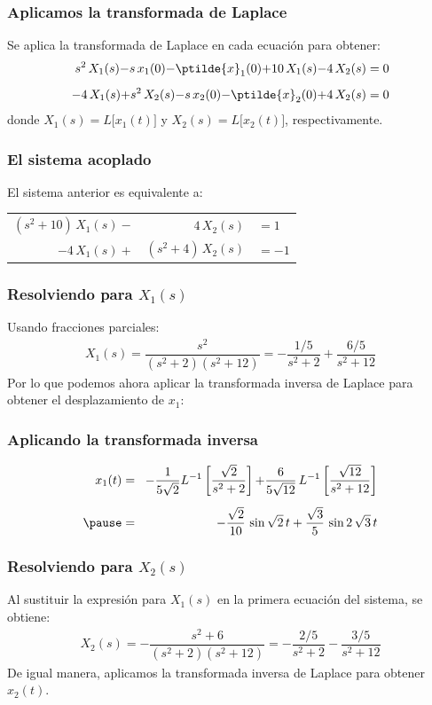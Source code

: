 \begin{frame}
\frametitle{Aplicamos la transformada de Laplace}
Se aplica la transformada de Laplace en cada ecuación para obtener: \pause
\begin{align*}
s^{2} \, X_{1}(s) {-} s \, x_{1}(0) {-} \ptilde{x}_{1}(0) {+} 10 \, X_{1}(s) {-} 4 \, X_{2}(s) = 0 \\[0.5em]
- 4 \, X_{1}(s) {+} s^{2} \, X_{2}(s) {-} s \, x_{2}(0) {-} \ptilde{x}_{2}(0) {+} 4 \, X_{2}(s) = 0
\end{align*}
donde $X_{1}(s) = L \big[x_{1} (t)\big]$ y $X_{2}(s) = L \big[x_{2} (t)\big]$, respectivamente.
\end{frame}
\begin{frame}
\frametitle{El sistema acoplado}
El sistema anterior es equivalente a:
\begin{table}
\begin{tabular}{r r l }
$(s^{2} + 10) \, X_{1}(s)-$ & $4 \, X_{2}(s)$ & $=1$ \\[0.5em]
$-4 \, X_{1}(s)+$ &$(s^{2} + 4) \, X_{2}(s)$ & $=-1$
\end{tabular}
\end{table}
\end{frame}
\begin{frame}
\frametitle{Resolviendo para $X_{1}(s)$}
Usando fracciones parciales:
\begin{align*}
X_{1}(s) = \dfrac{s^{2}}{(s^{2} + 2)(s^{2} + 12)} = - \dfrac{1/5}{s^{2} + 2} + \dfrac{6/5}{s^{2} + 12}
\end{align*}
\pause
Por lo que podemos ahora aplicar la transformada inversa de Laplace para obtener el desplazamiento de $x_{1}$:
\end{frame}
\begin{frame}
\frametitle{Aplicando la transformada inversa}
\begin{eqnarray*}
x_{1}(t) &=& \! -\dfrac{1}{5 \sqrt{2}} L^{-1} \left[ \dfrac{\sqrt{2}}{s^{2} + 2} \right] {+} \dfrac{6}{5 \sqrt{12}} \, L^{-1} \left[ \dfrac{\sqrt{12}}{s^{2} + 12} \right] \\[0.5em] \pause
&=& - \dfrac{\sqrt{2}}{10} \, \sin \sqrt{2} \, t + \dfrac{\sqrt{3}}{5} \, \sin 2 \, \sqrt{3} \, t
\end{eqnarray*}
\end{frame}
\begin{frame}
\frametitle{Resolviendo para $X_{2}(s)$}
Al sustituir la expresión para $X_{1}(s)$ en la primera ecuación del sistema, se obtiene:
\begin{align*}
X_{2}(s) = - \dfrac{s^{2} + 6}{(s^{2} + 2)(s^{2} + 12)} = - \dfrac{2/5}{s^{2} + 2} - \dfrac{3/5}{s^{2} + 12}
\end{align*}
\pause
De igual manera, aplicamos la transformada inversa de Laplace para obtener $x_{2}(t)$.
\end{frame}
